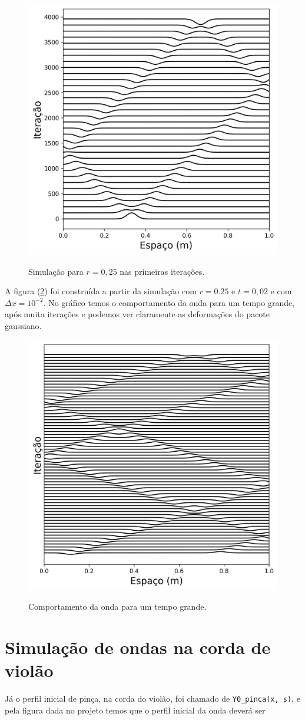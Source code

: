 \documentclass[a4paper, 11pt]{tufte-handout}
\begin{document}
\begin{figure}[h!] 
    \centering
    \caption{Simulação para \( r = 0,25 \) nas primeiras iterações.}
    \includegraphics[width=0.5\linewidth]{graf-tarefa1-c1}
    \label{fig:tarefa1-c1}
\end{figure}



A figura (\ref{fig:tarefa1-c2}) foi construída a partir da simulação com \( r = 0.25 \) e \( t = 0,02
\) e com \( \Delta x = 10^{-2}\). No gráfico temos o comportamento da onda para um tempo grande, após muita iterações e podemos
ver claramente as deformações do pacote gaussiano.

\begin{figure}[h!] 
    \centering
    \caption{Comportamento da onda para um tempo grande.}
    \includegraphics[width=0.50\linewidth]{graf-tarefa1-c2}
    \label{fig:tarefa1-c2}
\end{figure}


\section{Simulação de ondas na corda de violão}

Já o perfil inicial de pinça, na corda do violão, foi chamado de \verb|Y0_pinca(x, s)|, e pela
figura dada no projeto temos que o perfil inicial da onda deverá ser 
\end{document}
